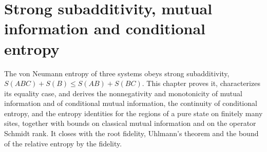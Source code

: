 \chapter{Strong subadditivity, mutual information and conditional entropy}
\label{ch:strong_subadditivity}

The von Neumann entropy of three systems obeys strong subadditivity,
$S(ABC)+S(B)\le S(AB)+S(BC)$. This chapter proves it, characterizes its
equality case, and derives the nonnegativity and monotonicity of mutual
information and of conditional mutual information, the continuity of
conditional entropy, and the entropy identities for the regions of a pure state
on finitely many sites, together with bounds on classical mutual information
and on the operator Schmidt rank. It closes with the root fidelity, Uhlmann's
theorem and the bound of the relative entropy by the fidelity.














